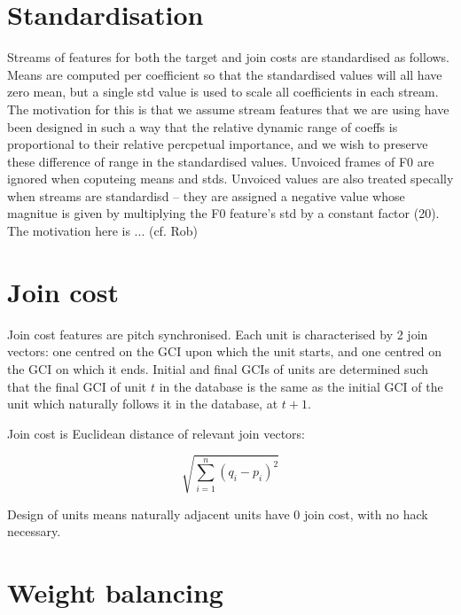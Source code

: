 
\section{Standardisation}

Streams of features for both the target and join costs are standardised as follows. Means are computed per coefficient so that the standardised values will all have zero mean, but a single std value is used to scale all coefficients in each stream. The motivation for this is that we assume stream features that we are using have been designed in such a way that the relative dynamic range of coeffs is proportional to their relative percpetual importance, and we wish to preserve these difference of range in the standardised values. Unvoiced frames of F0 are ignored when coputeing means and stds. Unvoiced values are also treated specally when streams are standardisd -- they are assigned a negative value whose magnitue is given by multiplying the F0 feature's std by a constant factor (20). The motivation here is ... (cf. Rob)



\section{Join cost}

Join cost features are pitch synchronised. Each unit is characterised by 2 join vectors: one centred on the GCI upon which the unit starts, and one centred on the GCI on which it ends. Initial and final GCIs of units are determined such that the final GCI of unit $t$ in the database is the same as the initial GCI of the unit which naturally follows it in the database, at $t+1$.

Join cost is Euclidean distance of relevant join vectors:

\begin{equation}
\sqrt{\sum_{i=1}^{n}(q_i - p_i)^{2}}
\end{equation}

Design of units means naturally adjacent units have 0 join cost, with no hack necessary.




\section{Weight balancing}

